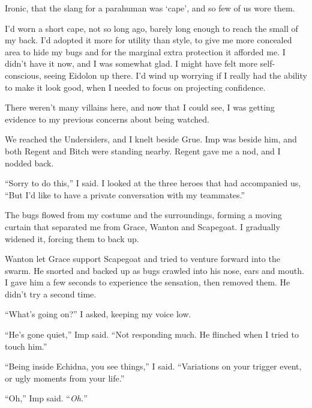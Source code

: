 Ironic, that the slang for a parahuman was `cape', and so few of us wore them.



I'd worn a short cape, not so long ago, barely long enough to reach the small of my back.    I'd adopted it more for utility than style, to give me more concealed area to hide my bugs and for the marginal extra protection it afforded me.  I didn't have it now, and I was somewhat glad.  I might have felt more self-conscious, seeing Eidolon up there.  I'd wind up worrying if I really had the ability to make it look good, when I needed to focus on projecting confidence.



There weren't many villains here, and now that I could see, I was getting evidence to my previous concerns about being watched.



We reached the Undersiders, and I knelt beside Grue.  Imp was beside him, and both Regent and Bitch were standing nearby.  Regent gave me a nod, and I nodded back.



``Sorry to do this,'' I said.  I looked at the three heroes that had accompanied us, ``But I'd like to have a private conversation with my teammates.''



The bugs flowed from my costume and the surroundings, forming a moving curtain that separated me from Grace, Wanton and Scapegoat.  I gradually widened it, forcing them to back up.



Wanton let Grace support Scapegoat and tried to venture forward into the swarm.  He snorted and backed up as bugs crawled into his nose, ears and mouth.  I gave him a few seconds to experience the sensation, then removed them.  He didn't try a second time.



``What's going on?'' I asked, keeping my voice low.



``He's gone quiet,'' Imp said.  ``Not responding much.  He flinched when I tried to touch him.''



``Being inside Echidna, you see things,'' I said.  ``Variations on your trigger event, or ugly moments from your life.''



``Oh,'' Imp said.  ``\emph{Oh.}''



